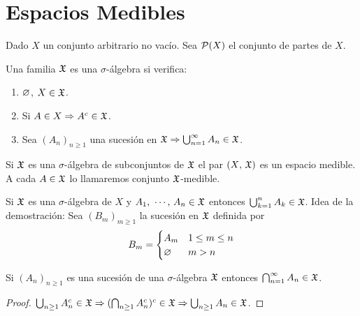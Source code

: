\section{Espacios Medibles}

Dado $X$ un conjunto arbitrario no vacío. Sea $\mathcal{P}(X)$ el conjunto de partes de $X$.

\begin{definition}
    Una familia $\mathfrak{X}$ es una $\sigma$-álgebra si verifica:
    \begin{enumerate}
        \item $\varnothing$, $X \in \mathfrak{X}$.
        \item Si $A \in X \Rightarrow A^c \in \mathfrak{X}$.
        \item Sea $(A_n)_{n \geq 1}$ una sucesión en $\mathfrak{X} \Rightarrow \bigcup_{n=1}^{\infty} A_n \in \mathfrak{X}$.
    \end{enumerate}
\end{definition}

\begin{definition}
    Si $\mathfrak{X}$ es una $\sigma$-álgebra de subconjuntos de $\mathfrak{X}$ el par $(X\text{, }\mathfrak{X})$ es un espacio medible. A cada $A \in \mathfrak{X}$
    lo llamaremos conjunto $\mathfrak{X}$-medible.
\end{definition}

\begin{note}
    Si $\mathfrak{X}$ es una $\sigma$-álgebra de $X$ y $A_1 \text{, } \cdots \text{, } A_n \in \mathfrak{X}$ entonces $\bigcup_{k=1}^{n} A_k \in \mathfrak{X}$.
    Idea de la demostración: Sea $(B_m)_{m \geq 1}$ la sucesión en $\mathfrak{X}$ definida por \begin{equation*}
        B_m = \begin{cases}
            A_m & 1 \leq m \leq n \\
            \varnothing  & m > n
        \end{cases}
    \end{equation*}
\end{note}

\begin{note}
    Si $(A_n)_{n \geq 1}$ es una sucesión de una $\sigma$-álgebra $\mathfrak{X}$ entonces $\bigcap_{n=1}^{\infty} A_n \in \mathfrak{X}$.
    \begin{proof}
        $\bigcup_{n \geq 1} A_n^c \in \mathfrak{X} \Rightarrow (\bigcap_{n \geq 1} A_n^c)^c \in \mathfrak{X} \Rightarrow \bigcup_{n \geq 1} A_n \in \mathfrak{X}$.
    \end{proof}
\end{note}

